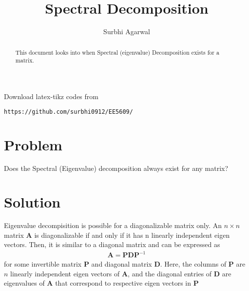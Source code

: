 \documentclass[journal,12pt,twocolumn]{IEEEtran}
\begin{document}
\let\StandardTheFigure\thefigure
\let\vec\mathbf

\renewcommand{\thefigure}{\theproblem}

\def\putbox#1#2#3{\makebox[0in][l]{\makebox[#1][l]{}\raisebox{\baselineskip}[0in][0in]{\raisebox{#2}[0in][0in]{#3}}}}
     \def\rightbox#1{\makebox[0in][r]{#1}}
     \def\centbox#1{\makebox[0in]{#1}}
     \def\topbox#1{\raisebox{-\baselineskip}[0in][0in]{#1}}
     \def\midbox#1{\raisebox{-0.5\baselineskip}[0in][0in]{#1}}
\vspace{3cm}

\title{Spectral Decomposition}
\author{Surbhi Agarwal}

\maketitle

\newpage


\bigskip

\renewcommand{\thefigure}{\theenumi}
\renewcommand{\thetable}{\theenumi}

\begin{abstract}
This document looks into when Spectral (eigenvalue) Decomposition exists for a matrix.
\end{abstract}

Download latex-tikz codes from 
%
\begin{lstlisting}
https://github.com/surbhi0912/EE5609/
\end{lstlisting}
%
\section{Problem}
Does the Spectral (Eigenvalue) decomposition always exist for any matrix?
\section{Solution}
Eigenvalue decompisition is possible for a diagonalizable matrix only. An $n\times n$ matrix $\vec{A}$ is diagonalizable if and only if it has n linearly independent eigen vectors. Then, it is similar to a diagonal matrix and can be expressed as
\begin{align}\label{eq1}
    \vec{A} = \vec{P}\vec{D}\vec{P}^{-1}
\end{align}
for some invertible matrix $\vec{P}$ and diagonal matrix $\vec{D}$. Here, the columns of $\vec{P}$ are $n$ linearly independent eigen vectors of $\vec{A}$, and the diagonal entries of $\vec{D}$ are eigenvalues of $\vec{A}$ that correspond to respective eigen vectors in $\vec{P}$
\end{document}
